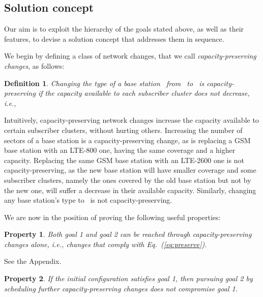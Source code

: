 \documentclass[10pt,journal,cspaper,compsoc]{IEEEtran}
\newcommand{\Eq}[1]{Eq.~(\ref{eq:#1})}
\newtheorem{property}{Property}
\newtheorem{definition}{Definition}
\begin{document}
\subsection{Solution concept}

Our aim is to exploit the hierarchy of the goals stated above, as well as their features, to devise a
solution concept that addresses them in sequence.

We begin by defining a class of network changes, that we call {\em capacity-preserving changes}, as follows:
\begin{definition}
Changing the type of a base station~ from~ to~ is {\em capacity-preserving} if
the capacity available to each subscriber cluster does not decrease, i.e.,

\end{definition}

Intuitively, capacity-preserving network changes increase the capacity available to certain subscriber clusters,
without hurting others. Increasing the number of sectors of a base station is a capacity-preserving change, as is
replacing a GSM base station with an LTE-800 one, having the same coverage and a higher capacity. Replacing the same
GSM base station with an LTE-2600 one is not capacity-preserving, as the new base station will have smaller coverage
and some subscriber clusters, namely the ones covered by the old base station but not by the new one, will suffer a
decrease in their available capacity. Similarly, changing any base station's type
to~ is not capacity-preserving.

We are now in the position of proving the following useful properties:
\begin{property}
\label{prop:updates-enough}
Both goal 1 and goal 2 can be reached through capacity-preserving changes alone, i.e.,
changes that comply with \Eq{preserve}.
\end{property}
\begin{IEEEproof}
See the Appendix.
\end{IEEEproof}
\begin{property}
\label{prop:conflict12}
If the initial configuration satisfies goal 1, then pursuing goal 2 by scheduling further
capacity-preserving changes
does not compromise goal 1.
\end{property}
\end{document}
